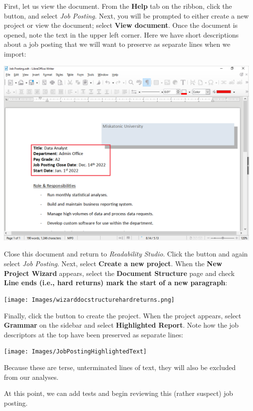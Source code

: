 \documentclass[
]{book}
\theoremstyle{definition}
\theoremstyle{definition}
\theoremstyle{definition}
\theoremstyle{definition}
\theoremstyle{remark}
\begin{document}
First, let us view the document. From the \textbf{Help} tab on the ribbon, click the  button, and select \emph{Job Posting}. Next, you will be prompted to either create a new project or view the document; select \textbf{View document}. Once the document is opened, note the text in the upper left corner. Here we have short descriptions about a job posting that we will want to preserve as separate lines when we import:

\begin{center}\includegraphics[width=0.75\linewidth,]{Images/NonGenerated/JostPostingViewDocument} \end{center}

Close this document and return to \emph{Readability Studio}. Click the  button and again select \emph{Job Posting}. Next, select \textbf{Create a new project}. When the \textbf{New Project Wizard} appears, select the \textbf{Document Structure} page and check \textbf{Line ends (i.e., hard returns) mark the start of a new paragraph}:

\texttt{[image: Images/wizarddocstructurehardreturns.png]}

Finally, click the  button to create the project. When the project appears, select \textbf{Grammar} on the sidebar and select \textbf{Highlighted Report}. Note how the job descriptors at the top have been preserved as separate lines:

\begin{center}\texttt{[image: Images/JobPostingHighlightedText]} \end{center}

Because these are terse, unterminated lines of text, they will also be excluded from our analyses.

At this point, we can add tests and begin reviewing this (rather suspect) job posting.
\end{document}
